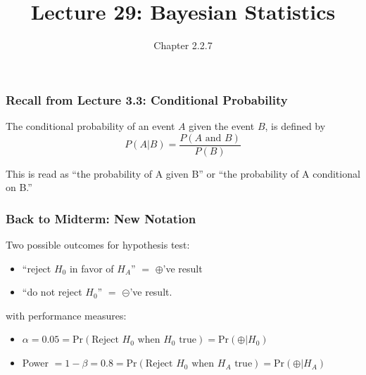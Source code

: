\documentclass[slides]{beamer}
\title{Lecture 29: Bayesian Statistics}
\author{Chapter 2.2.7}
\date{}
\newcommand{\blue}[1]{\textcolor{blue2}{#1}}
\newcommand{\prob}{\mbox{Pr}}
\newcommand{\cp}{\oplus}
\newcommand{\cm}{\circleddash}
\begin{document}
\begin{frame}
\titlepage
\end{frame}



\begin{frame}
\frametitle{Recall from Lecture 3.3: Conditional Probability}
The \blue{conditional probability} of an event $A$ given the event $B$, is defined by
\[
P(A|B) = \frac{P(A \mbox{ and } B)}{P(B)}
\]  

\vspace{0.5cm}

This is read as ``the probability of A \blue{given} B'' or ``the probability of A \blue{conditional on} B.''

\end{frame}



\begin{frame}
\frametitle{Back to Midterm: New Notation}
Two possible outcomes for hypothesis test:
\begin{itemize}
\item ``reject $H_0$ in favor of $H_A$'' $=$ $\cp$'ve result
\item ``do not reject $H_0$'' $=$ $\cm$'ve result.
\end{itemize}
\pause
\vspace{0.5cm}

with performance measures:
\begin{itemize}
\item $\alpha=0.05=\prob(\mbox{Reject } H_0 \mbox{ when $H_0$ true}) = \prob(\cp|H_0)$
\item Power $=1-\beta=0.8=\prob(\mbox{Reject } H_0 \mbox{ when $H_A$ true}) = \prob(\cp|H_A)$
\end{itemize} 

\end{frame}
\end{document}
